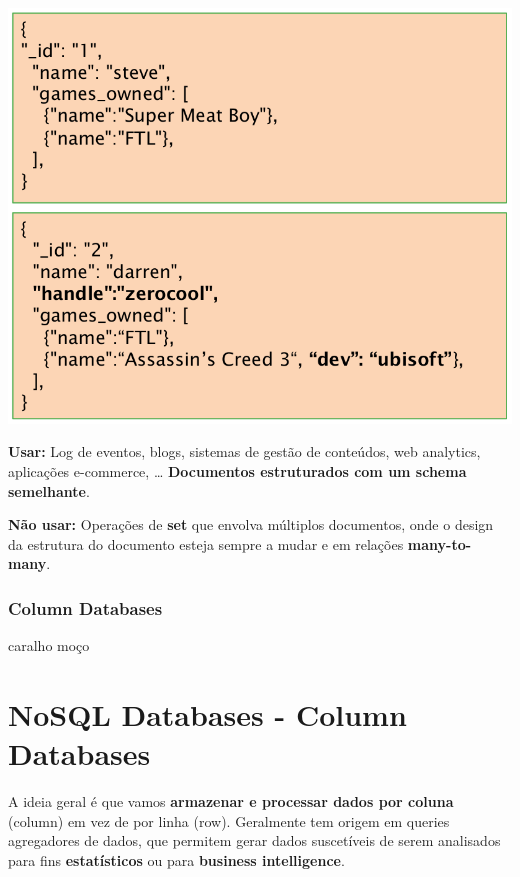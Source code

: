 \documentclass{article}
\begin{document}
\begin{center}
  \includegraphics[scale=0.2]{9}
\end{center}

\begin{flushleft}
  \textbf{Usar:} Log de eventos, blogs, sistemas de gestão de conteúdos,
  web analytics, aplicações e-commerce, \dots
  \textbf{Documentos estruturados com um schema semelhante}.

  \textbf{Não usar:} Operações de \textbf{set} que envolva múltiplos documentos,
  onde o design da estrutura do documento esteja sempre a mudar e
  em relações \textbf{many-to-many}.
\end{flushleft}

\subsubsection{Column Databases}

caralho moço






\pagebreak
\section{NoSQL Databases - Column Databases}

A ideia geral é que vamos \textbf{armazenar e processar dados por coluna} (column) em vez de por linha
(row). Geralmente tem origem em queries agregadores de dados, que permitem gerar
dados suscetíveis de serem analisados para fins \textbf{estatísticos} ou para \textbf{business intelligence}.
\end{document}
